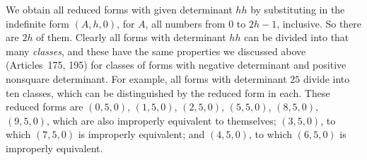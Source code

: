 We obtain all reduced forms with given determinant $hh$ by substituting in the indefinite form $(A,h,0)$, for $A$, all numbers from $0$ to $2h-1$, inclusive. So there are $2h$ of them. Clearly all forms with determinant $hh$ can be divided into that many \textit{classes}, and these have the same properties we discussed above (Articles~175, 195) for classes of forms with negative determinant and positive nonsquare determinant. For example, all forms with determinant $25$ divide into ten classes, which can be distinguished by the reduced form in each. These reduced forms are $(0,5,0)$, $(1,5,0)$, $(2,5,0)$, $(5,5,0)$, $(8,5,0)$, $(9,5,0)$, which are also improperly equivalent to themselves; $(3,5,0)$, to which $(7,5,0)$ is improperly equivalent; and $(4,5,0)$, to which $(6,5,0)$ is improperly equivalent.

